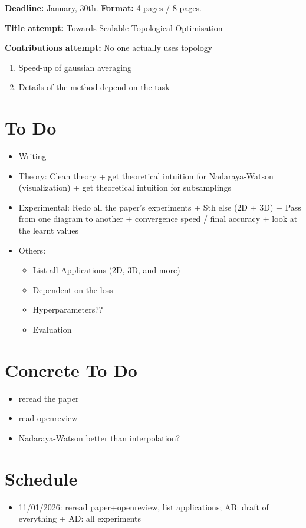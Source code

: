 \documentclass{article} %
\theoremstyle{plain}
\theoremstyle{definition}
\theoremstyle{remark}
\begin{document}
\newpage
\iffalse
\textbf{Deadline:} January, 30th.
\textbf{Format:} 4 pages / 8 pages.

\textbf{Title attempt:} Towards Scalable Topological Optimisation

\textbf{Contributions attempt:} No one actually uses topology
\begin{enumerate}
    \item Speed-up of gaussian averaging
    \item Details of the method depend on the task
\end{enumerate}

\section{To Do}
\begin{itemize}
    \item Writing
    \item Theory: Clean theory + get theoretical intuition for Nadaraya-Watson (visualization) + get theoretical intuition for subsamplings
    \item Experimental: Redo all the paper's experiments + Sth else (2D + 3D) + Pass from one diagram to another + convergence speed / final accuracy + look at the learnt values
    \item Others:
    \begin{itemize}
        \item List all Applications (2D, 3D, and more)
        \item Dependent on the loss
        \item Hyperparameters??
        \item Evaluation
    \end{itemize}
\end{itemize}

\section{Concrete To Do}
\begin{itemize}
    \item reread the paper
    \item read openreview
    \item Nadaraya-Watson better than interpolation?
\end{itemize}

\section{Schedule}
\begin{itemize}
    \item 11/01/2026: reread paper+openreview, list applications; AB: draft of everything + AD: all experiments
\end{itemize}
\end{document}
